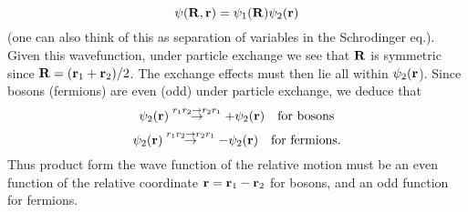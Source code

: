 \documentclass[10pt,letterpaper]{article}
\begin{document}
	\[
		\psi(\mathbf{R},\mathbf{r}) = \psi_1(\mathbf{R})\psi_2(\mathbf{r})
	\]
	(one can also think of this as separation of variables in the Schrodinger eq.). Given this
	wavefunction, under particle exchange
	we see that $\mathbf{R}$ is symmetric since $\mathbf{R} =( \mathbf{r}_1+\mathbf{r}_2)/2$. The exchange effects must then lie all within 	$\psi_2(\mathbf{r}$). Since bosons (fermions) are even (odd) under particle exchange, we 
	deduce that
	\[
		\psi_2(\mathbf{r}) \overset{r_1r_2\to r_2r_1}\to +\psi_2(\mathbf{r})\quad \text{for bosons}
	\]
	\[
		\psi_2(\mathbf{r}) \overset{r_1r_2\to r_2r_1}\to -\psi_2(\mathbf{r})\quad \text{for fermions}.
	\]
	Thus product form the wave function of the relative motion
	must be an even function of the relative coordinate $\mathbf{r}= \mathbf{r}_1-\mathbf{r}_2$ for bosons, and an odd 
	function for fermions.
\eenum
\end{document}
